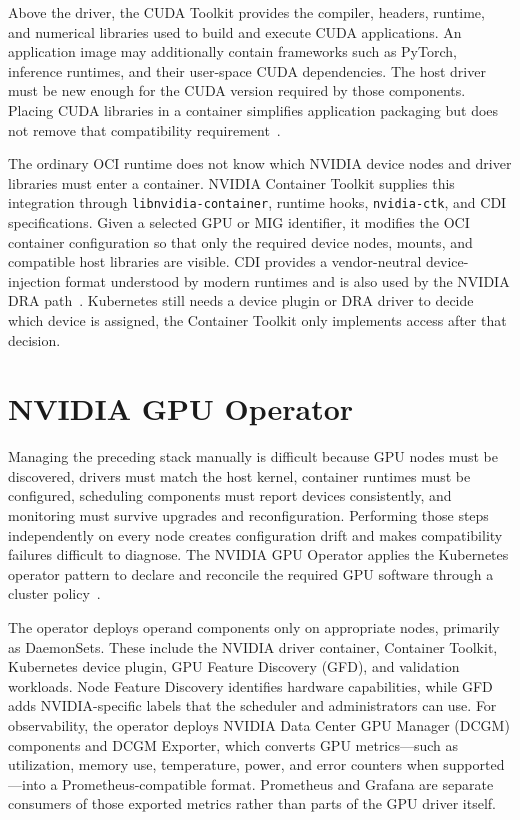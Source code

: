 Above the driver, the CUDA Toolkit provides the compiler, headers, runtime, and numerical libraries used to build and execute CUDA applications. An application image may additionally contain frameworks such as PyTorch, inference runtimes, and their user-space CUDA dependencies. The host driver must be new enough for the CUDA version required by those components. Placing CUDA libraries in a container simplifies application packaging but does not remove that compatibility requirement~\cite{nvidia2026cudainstall}.

The ordinary OCI runtime does not know which NVIDIA device nodes and driver libraries must enter a container. NVIDIA Container Toolkit supplies this integration through \texttt{libnvidia-container}, runtime hooks, \texttt{nvidia-ctk}, and CDI specifications. Given a selected GPU or MIG identifier, it modifies the OCI container configuration so that only the required device nodes, mounts, and compatible host libraries are visible. CDI provides a vendor-neutral device-injection format understood by modern runtimes and is also used by the NVIDIA DRA path~\cite{nvidia2026containertoolkit}. Kubernetes still needs a device plugin or DRA driver to decide which device is assigned, the Container Toolkit only implements access after that decision.

\section{NVIDIA GPU Operator}
\label{sec:gpu-operator}

Managing the preceding stack manually is difficult because GPU nodes must be discovered, drivers must match the host kernel, container runtimes must be configured, scheduling components must report devices consistently, and monitoring must survive upgrades and reconfiguration. Performing those steps independently on every node creates configuration drift and makes compatibility failures difficult to diagnose. The NVIDIA GPU Operator applies the Kubernetes operator pattern to declare and reconcile the required GPU software through a cluster policy~\cite{nvidia2026gpuoperator}.

The operator deploys operand components only on appropriate nodes, primarily as DaemonSets. These include the NVIDIA driver container, Container Toolkit, Kubernetes device plugin, GPU Feature Discovery (GFD), and validation workloads. Node Feature Discovery identifies hardware capabilities, while GFD adds NVIDIA-specific labels that the scheduler and administrators can use. For observability, the operator deploys NVIDIA Data Center GPU Manager (DCGM) components and DCGM Exporter, which converts GPU metrics---such as utilization, memory use, temperature, power, and error counters when supported---into a Prometheus-compatible format. Prometheus and Grafana are separate consumers of those exported metrics rather than parts of the GPU driver itself.

